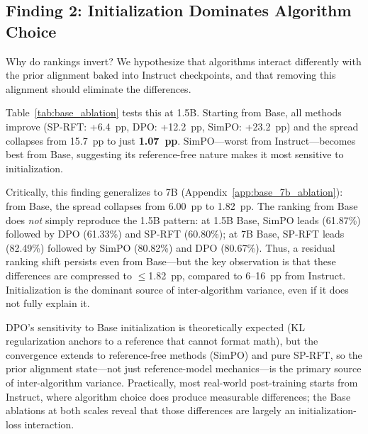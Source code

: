 \documentclass{article}
\newcommand{\sprft}{SP-RFT}
\begin{document}
\subsection{Finding 2: Initialization Dominates Algorithm Choice}
\label{sec:base_ablation}

Why do rankings invert? We hypothesize that algorithms interact differently with the prior alignment baked into Instruct checkpoints, and that removing this alignment should eliminate the differences.

Table~\ref{tab:base_ablation} tests this at 1.5B. Starting from Base, all methods improve (\sprft{}: +6.4~pp, DPO: +12.2~pp, SimPO: +23.2~pp) and the spread collapses from 15.7~pp to just \textbf{1.07~pp}.
SimPO---worst from Instruct---becomes best from Base, suggesting its reference-free nature makes it most sensitive to initialization.

Critically, this finding generalizes to 7B (Appendix~\ref{app:base_7b_ablation}): from Base, the spread collapses from 6.00~pp to 1.82~pp. The ranking from Base does \emph{not} simply reproduce the 1.5B pattern: at 1.5B Base, SimPO leads (61.87\%) followed by DPO (61.33\%) and \sprft{} (60.80\%); at 7B Base, \sprft{} leads (82.49\%) followed by SimPO (80.82\%) and DPO (80.67\%). Thus, a residual ranking shift persists even from Base---but the key observation is that these differences are compressed to $\leq$1.82~pp, compared to 6--16~pp from Instruct. Initialization is the dominant source of inter-algorithm variance, even if it does not fully explain it.

DPO's sensitivity to Base initialization is theoretically expected (KL regularization anchors to a reference that cannot format math), but the convergence extends to reference-free methods (SimPO) and pure \sprft{}, so the prior alignment state---not just reference-model mechanics---is the primary source of inter-algorithm variance. Practically, most real-world post-training starts from Instruct, where algorithm choice does produce measurable differences; the Base ablations at both scales reveal that those differences are largely an initialization-loss interaction.
\end{document}
